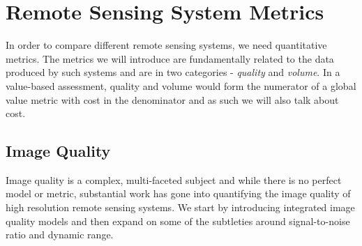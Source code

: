 \documentclass[]{spieman}  %
\begin{document}
%
%
%

\section{Remote Sensing System Metrics}
\label{sec:Metrics}
In order to compare different remote sensing systems, we need quantitative metrics.  The metrics we will introduce are fundamentally related to the data produced by such systems and are in two categories - \emph{quality} and \emph{volume}.  In a value-based assessment, quality and volume would form the numerator of a global value metric with cost in the denominator and as such we will also talk about cost.

\subsection{Image Quality}
\label{sec:iq}

Image quality is a complex, multi-faceted subject and while there is no perfect model or metric, substantial work has gone into quantifying the image quality of high resolution remote sensing systems.  We start by introducing integrated image quality models and then expand on some of the subtleties around signal-to-noise ratio and dynamic range.
\end{document}
